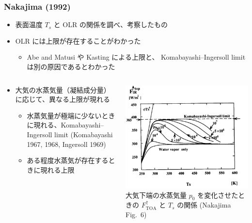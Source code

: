 \documentclass[aspectratio=149]{beamer}
\newcommand{\hmTOA}{\mathrm{TOA}}
\begin{document}
\begin{frame}
	\frametitle{Nakajima \etal (1992)}
	\begin{itemize}
		\item 表面温度 \(T_s\) と OLR の関係を調べ、考察したもの
		\item OLR には上限が存在することがわかった
			\begin{itemize}
				\item Abe and Matusi や Kasting による上限と、
					Komabayashi--Ingersoll limit は別の原因であるとわかった
			\end{itemize}
	\end{itemize}
	\begin{columns}[onlytextwidth,T]
		\begin{column}{.6\textwidth}
			\begin{itemize}
				\item 大気の水蒸気量（凝結成分量）に応じて、異なる上限が現れる
					\begin{itemize}
						\item 水蒸気量が極端に少ないときに現れる、Komabayashi--Ingersoll limit
							(Komabayashi 1967, 1968, Ingersoll 1969)
						\item ある程度水蒸気が存在するときに現れる上限
					\end{itemize}
			\end{itemize}
		\end{column}
		\begin{column}{.35\textwidth}
			\centering\scriptsize
			\includegraphics[width=\textwidth]{nakajima6.png}\\
			大気下端の水蒸気量 \(p_0\) を変化させたときの \(F^\uparrow_\hmTOA\) と
			\(T_s\) の関係 (Nakajima \etal Fig.~6)
		\end{column}
	\end{columns}
\end{frame}
\end{document}
